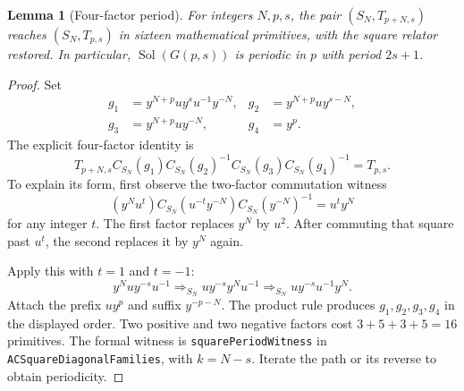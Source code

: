 \documentclass[11pt]{article}
\newtheorem{lemma}[theorem]{Lemma}
\theoremstyle{definition}\newtheorem{definition}[theorem]{Definition}
\theoremstyle{remark}\newtheorem{remark}[theorem]{Remark}
\newcommand{\Sol}{\operatorname{Sol}}
\newcommand{\wit}[1]{\mathrel{\Longrightarrow_{#1}}}
\begin{document}
\begin{lemma}[Four-factor period]\label{lem:oldperiod}
For integers $N,p,s$, the pair $(S_N,T_{p+N,s})$ reaches $(S_N,T_{p,s})$ in sixteen mathematical primitives, with the square relator restored. In particular, $\Sol(G(p,s))$ is periodic in $p$ with period $2s+1$.
\end{lemma}
\begin{proof}
Set
\[
\begin{aligned}
g_1&=y^{N+p}uy^su^{-1}y^{-N},&g_2&=y^{N+p}uy^{s-N},\\
g_3&=y^{N+p}uy^{-N},&g_4&=y^p.
\end{aligned}
\]
The explicit four-factor identity is
\begin{equation}\label{eq:oldperiod}
T_{p+N,s}C_{S_N}(g_1)C_{S_N}(g_2)^{-1}C_{S_N}(g_3)C_{S_N}(g_4)^{-1}=T_{p,s}.
\end{equation}
To explain its form, first observe the two-factor commutation witness
\[
(y^Nu^t)C_{S_N}(u^{-t}y^{-N})C_{S_N}(y^{-N})^{-1}=u^ty^N
\]
for any integer $t$. The first factor replaces $y^N$ by $u^2$. After commuting that square past $u^t$, the second replaces it by $y^N$ again.

Apply this with $t=1$ and $t=-1$:
\[
y^Nuy^{-s}u^{-1}\wit{S_N}uy^{-s}y^Nu^{-1}\wit{S_N}uy^{-s}u^{-1}y^N.
\]
Attach the prefix $uy^p$ and suffix $y^{-p-N}$. The product rule produces $g_1,g_2,g_3,g_4$ in the displayed order. Two positive and two negative factors cost $3+5+3+5=16$ primitives. The formal witness is \texttt{squarePeriodWitness} in \texttt{ACSquareDiagonalFamilies}, with $k=N-s$. Iterate the path or its reverse to obtain periodicity.
\end{proof}
\end{document}
